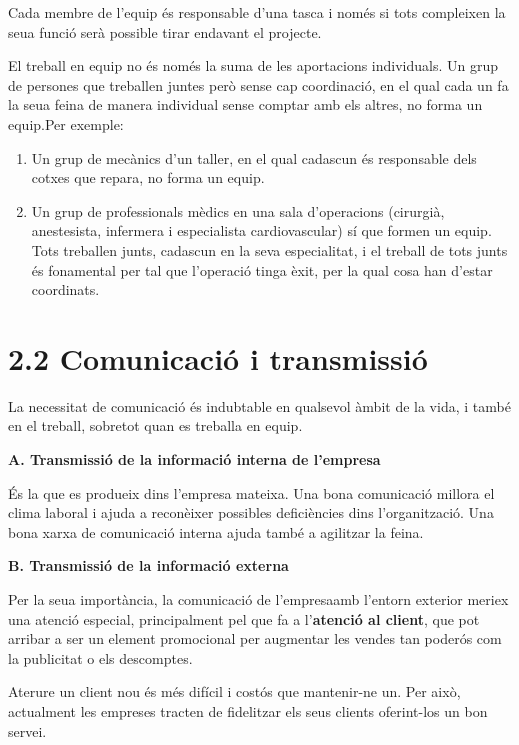 \documentclass[
  a4paper,
  openany]{book}
\begin{document}
Cada membre de l'equip és responsable d'una tasca i només si tots compleixen la seua funció serà possible tirar endavant el projecte.

El treball en equip no és només la suma de les aportacions individuals. Un grup de persones que treballen juntes però sense cap coordinació, en el qual cada un fa la seua feina de manera individual sense comptar amb els altres, no forma un equip.Per exemple:

\begin{enumerate}
\def\labelenumi{\alph{enumi}.}
\item
  Un grup de mecànics d'un taller, en el qual cadascun és responsable dels cotxes que repara, no forma un equip.
\item
  Un grup de professionals mèdics en una sala d'operacions (cirurgià, anestesista, infermera i especialista cardiovascular) sí que formen un equip. Tots treballen junts, cadascun en la seva especialitat, i el treball de tots junts és fonamental per tal que l'operació tinga èxit, per la qual cosa han d'estar coordinats.
\end{enumerate}

\hypertarget{comunicaciuxf3-i-transmisiuxf3}{%
\section{2.2 Comunicació i transmissió}\label{comunicaciuxf3-i-transmisiuxf3}}

La necessitat de comunicació és indubtable en qualsevol àmbit de la vida, i també en el treball, sobretot quan es treballa en equip.

\textbf{A. Transmissió de la informació interna de l'empresa}

És la que es produeix dins l'empresa mateixa. Una bona comunicació millora el clima laboral i ajuda a reconèixer possibles deficiències dins l'organització. Una bona xarxa de comunicació interna ajuda també a agilitzar la feina.

\textbf{B. Transmissió de la informació externa}

Per la seua importància, la comunicació de l'empresaamb l'entorn exterior meriex una atenció especial, principalment pel que fa a l'\textbf{atenció al client}, que pot arribar a ser un element promocional per augmentar les vendes tan poderós com la publicitat o els descomptes.

Aterure un client nou és més difícil i costós que mantenir-ne un. Per això, actualment les empreses tracten de fidelitzar els seus clients oferint-los un bon servei.
\end{document}
